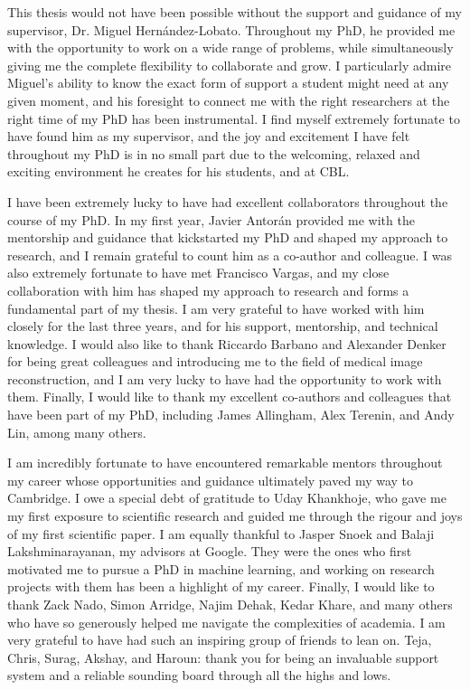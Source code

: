 
\begin{acknowledgements}      

This thesis would not have been possible without the support and guidance of my supervisor, Dr. Miguel Hernández-Lobato. Throughout my PhD, he provided me with the opportunity to work on a wide range of problems, while simultaneously giving me the complete flexibility to collaborate and grow. I particularly admire Miguel's ability to know the exact form of support a student might need at any given moment, and his foresight to connect me with the right researchers at the right time of my PhD has been instrumental. I find myself extremely fortunate to have found him as my supervisor, and the joy and excitement I have felt throughout my PhD is in no small part due to the welcoming, relaxed and exciting environment he creates for his students, and at CBL.

I have been extremely lucky to have had excellent collaborators throughout the course of my PhD. In my first year, Javier Antorán provided me with the mentorship and guidance that kickstarted my PhD and shaped my approach to research, and I remain grateful to count him as a co-author and colleague. I was also extremely fortunate to have met Francisco Vargas, and my close collaboration with him has shaped my approach to research and forms a fundamental part of my thesis. I am very grateful to have worked with him closely for the last three years, and for his support, mentorship, and technical knowledge. I would also like to thank Riccardo Barbano and Alexander Denker for being great colleagues and introducing me to the field of medical image reconstruction, and I am very lucky to have had the opportunity to work with them. Finally, I would like to thank my excellent co-authors and colleagues that have been part of my PhD, including James Allingham, Alex Terenin, and Andy Lin, among many others.

I am incredibly fortunate to have encountered remarkable mentors throughout my career whose opportunities and guidance ultimately paved my way to Cambridge. I owe a special debt of gratitude to Uday Khankhoje, who gave me my first exposure to scientific research and guided me through the rigour and joys of my first scientific paper. I am equally thankful to Jasper Snoek and Balaji Lakshminarayanan, my advisors at Google. They were the ones who first motivated me to pursue a PhD in machine learning, and working on research projects with them has been a highlight of my career. Finally, I would like to thank Zack Nado, Simon Arridge, Najim Dehak, Kedar Khare, and many others who have so generously helped me navigate the complexities of academia. I am very grateful to have had such an inspiring group of friends to lean on. Teja, Chris, Surag, Akshay, and Haroun: thank you for being an invaluable support system and a reliable sounding board through all the highs and lows.


\end{acknowledgements}

